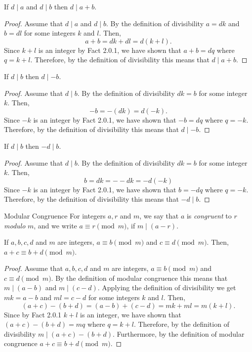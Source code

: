 \documentclass{report}
\begin{document}
\begin{proposition}{}{}
  If $d \mid a$ and $d \mid b$ then $d \mid a + b$.
\end{proposition}

\begin{proof}
  Assume that $d \mid a$ and $d \mid b$.
  By the definition of divisibility $a = dk$ and $b = dl$ for some integers $k$ and $l$.
  Then, $$a + b = dk + dl = d(k + l).$$
  Since $k + l$ is an integer by Fact 2.0.1, we have shown that $a + b = dq$ where $q = k + l$.
  Therefore, by the definition of divisibility this means that $d \mid a + b$.
\end{proof}

\begin{proposition}{}{}
  If $d \mid b$ then $d \mid -b$.
\end{proposition}

\begin{proof}
  Assume that $d \mid b$.
  By the definition of divisibility $dk = b$ for some integer $k$.
  Then, $$-b = -(dk) = d(-k).$$
  Since $-k$ is an integer by Fact 2.0.1, we have shown that $-b = dq$ where $q = -k$.
  Therefore, by the definition of divisibility this means that $d \mid -b$.
\end{proof}

\begin{proposition}{}{}
  If $d \mid b$ then $-d \mid b$.
\end{proposition}

\begin{proof}
  Assume that $d \mid b$.
  By the definition of divisibility $dk = b$ for some integer $k$.
  Then, $$b = dk = --dk = -d(-k)$$
  Since $-k$ is an integer by Fact 2.0.1, we have shown that $b = -dq$ where $q = -k$.
  Therefore, by the definition of divisibility this means that $-d \mid b$.
\end{proof}

\begin{definition}{Modular Congruence}{}
  For integers $a, r$ and $m$, we say that $a$ is \emph{congruent} to $r$ \emph{modulo} $m$, and we write $a \equiv r \pmod{m}$, if $m \mid (a - r)$.
\end{definition}

\begin{proposition}{}{}
  If $a,b,c,d$ and $m$ are integers, $a \equiv b \pmod{m}$ and $c \equiv d \pmod{m}$. Then, $a + c \equiv b + d \pmod{m}$.
\end{proposition}

\begin{proof}
  Assume that $a,b,c,d$ and $m$ are integers, $a \equiv b \pmod{m}$ and $c \equiv d \pmod{m}$.
  By the definition of modular congruence this means that $m \mid (a - b)$ and $m \mid (c - d)$.
  Applying the definition of divisibility we get $mk = a - b$ and $ml = c - d$ for some integers $k$ and $l$.
  Then, $$(a + c) - (b + d) = (a - b) + (c - d) = mk + ml = m(k + l).$$
  Since by Fact 2.0.1 $k + l$ is an integer, we have shown that $(a + c) - (b + d) = mq$ where $q = k + l$.
  Therefore, by the definition of divisibility $m \mid (a + c) - (b + d)$.
  Furthermore, by the definition of modular congruence $a + c \equiv b + d \pmod{m}$.
\end{proof}
\end{document}
